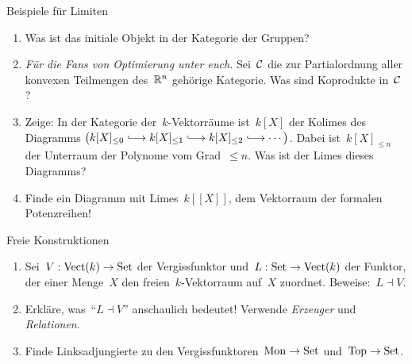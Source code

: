 \documentclass{uebblatt}
\begin{document}


\begin{aufgabe}{Beispiele für Limiten}
\begin{enumerate}
\item Was ist das initiale Objekt in der Kategorie der Gruppen?
\item \emph{Für die Fans von Optimierung unter euch.} Sei~$\mathcal{C}$ die zur
Partialordnung aller konvexen Teilmengen des~$\mathbb{R}^n$ gehörige Kategorie. Was
sind Koprodukte in~$\mathcal{C}$?
\item Zeige: In der Kategorie der~$k$-Vektorräume ist~$k[X]$ der Kolimes des
Diagramms $\bigl(k[X]_{\leq0} \lhra k[X]_{\leq1} \lhra k[X]_{\leq2} \lhra
\cdots \bigr)$. Dabei ist~$k[X]_{\leq n}$ der Unterraum der Polynome vom
Grad~$\leq n$. Was ist der Limes dieses Diagramms?
\item Finde ein Diagramm mit Limes~$k[[X]]$, dem Vektorraum
der formalen Potenzreihen!
\end{enumerate}
\end{aufgabe}

\begin{aufgabe}{Freie Konstruktionen}
\begin{enumerate}
\item Sei~$V : \mathrm{Vect}(k) \to \mathrm{Set}$ der Vergissfunktor und~$L : \mathrm{Set} \to
\mathrm{Vect}(k)$ der Funktor, der einer Menge~$X$ den freien~$k$-Vektorraum
auf~$X$ zuordnet. Beweise:~$L \dashv V$.
\item Erkläre, was~"`$L \dashv V$"' anschaulich bedeutet!
Verwende \emph{Erzeuger} und \emph{Relationen}.
\item Finde Linksadjungierte zu den Vergissfunktoren~$\mathrm{Mon} \to \mathrm{Set}$
und~$\mathrm{Top} \to \mathrm{Set}$.
\end{enumerate}
\end{aufgabe}
\end{document}

